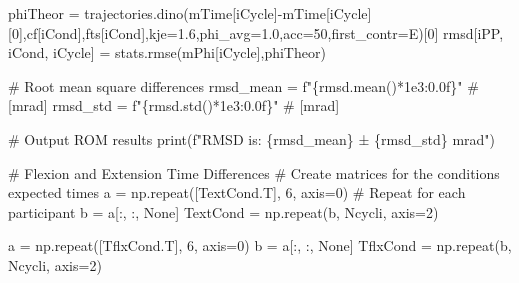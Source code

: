 \documentclass[
  11pt,
  a4paper]{article}
\newenvironment{Shaded}{\begin{snugshade}}{\end{snugshade}}
\newcommand{\BuiltInTok}[1]{\textcolor[rgb]{0.00,0.23,0.31}{#1}}
\newcommand{\CommentTok}[1]{\textcolor[rgb]{0.37,0.37,0.37}{#1}}
\newcommand{\DecValTok}[1]{\textcolor[rgb]{0.68,0.00,0.00}{#1}}
\newcommand{\FloatTok}[1]{\textcolor[rgb]{0.68,0.00,0.00}{#1}}
\newcommand{\NormalTok}[1]{\textcolor[rgb]{0.00,0.23,0.31}{#1}}
\newcommand{\OperatorTok}[1]{\textcolor[rgb]{0.37,0.37,0.37}{#1}}
\newcommand{\SpecialCharTok}[1]{\textcolor[rgb]{0.37,0.37,0.37}{#1}}
\newcommand{\SpecialStringTok}[1]{\textcolor[rgb]{0.13,0.47,0.30}{#1}}
\newcommand{\StringTok}[1]{\textcolor[rgb]{0.13,0.47,0.30}{#1}}
\newcommand{\VariableTok}[1]{\textcolor[rgb]{0.07,0.07,0.07}{#1}}
\begin{document}
\begin{Shaded}
\begin{Highlighting}[]
\NormalTok{            phiTheor }\OperatorTok{=}\NormalTok{ trajectories.dino(mTime[iCycle]}\OperatorTok{{-}}\NormalTok{mTime[iCycle][}\DecValTok{0}\NormalTok{],cf[iCond],fts[iCond],kje}\OperatorTok{=}\FloatTok{1.6}\NormalTok{,phi\_avg}\OperatorTok{=}\FloatTok{1.0}\NormalTok{,acc}\OperatorTok{=}\DecValTok{50}\NormalTok{,first\_contr}\OperatorTok{=}\StringTok{\textquotesingle{}E\textquotesingle{}}\NormalTok{)[}\DecValTok{0}\NormalTok{]}
\NormalTok{            rmsd[iPP, iCond, iCycle] }\OperatorTok{=}\NormalTok{ stats.rmse(mPhi[iCycle],phiTheor)}

\CommentTok{\# Root mean square differences}
\NormalTok{rmsd\_mean }\OperatorTok{=} \SpecialStringTok{f"}\SpecialCharTok{\{}\NormalTok{rmsd}\SpecialCharTok{.}\NormalTok{mean()}\OperatorTok{*}\FloatTok{1e3}\SpecialCharTok{:0.0f\}}\SpecialStringTok{"} \CommentTok{\# [mrad] }
\NormalTok{rmsd\_std  }\OperatorTok{=} \SpecialStringTok{f"}\SpecialCharTok{\{}\NormalTok{rmsd}\SpecialCharTok{.}\NormalTok{std()}\OperatorTok{*}\FloatTok{1e3}\SpecialCharTok{:0.0f\}}\SpecialStringTok{"}  \CommentTok{\# [mrad] }

\CommentTok{\# Output ROM results}
\BuiltInTok{print}\NormalTok{(}\SpecialStringTok{f"RMSD is: }\SpecialCharTok{\{}\NormalTok{rmsd\_mean}\SpecialCharTok{\}}\SpecialStringTok{ ± }\SpecialCharTok{\{}\NormalTok{rmsd\_std}\SpecialCharTok{\}}\SpecialStringTok{ mrad"}\NormalTok{)}

\CommentTok{\# Flexion and Extension Time Differences}
\CommentTok{\# Create matrices for the condition\textquotesingle{}s expected times}
\NormalTok{a }\OperatorTok{=}\NormalTok{ np.repeat([TextCond.T], }\DecValTok{6}\NormalTok{, axis}\OperatorTok{=}\DecValTok{0}\NormalTok{)  }\CommentTok{\# Repeat for each participant}
\NormalTok{b }\OperatorTok{=}\NormalTok{ a[:, :, }\VariableTok{None}\NormalTok{]}
\NormalTok{TextCond }\OperatorTok{=}\NormalTok{ np.repeat(b, Ncycli, axis}\OperatorTok{=}\DecValTok{2}\NormalTok{)}

\NormalTok{a }\OperatorTok{=}\NormalTok{ np.repeat([TflxCond.T], }\DecValTok{6}\NormalTok{, axis}\OperatorTok{=}\DecValTok{0}\NormalTok{)}
\NormalTok{b }\OperatorTok{=}\NormalTok{ a[:, :, }\VariableTok{None}\NormalTok{]}
\NormalTok{TflxCond }\OperatorTok{=}\NormalTok{ np.repeat(b, Ncycli, axis}\OperatorTok{=}\DecValTok{2}\NormalTok{)}


\end{Highlighting}
\end{Shaded}
\end{document}
